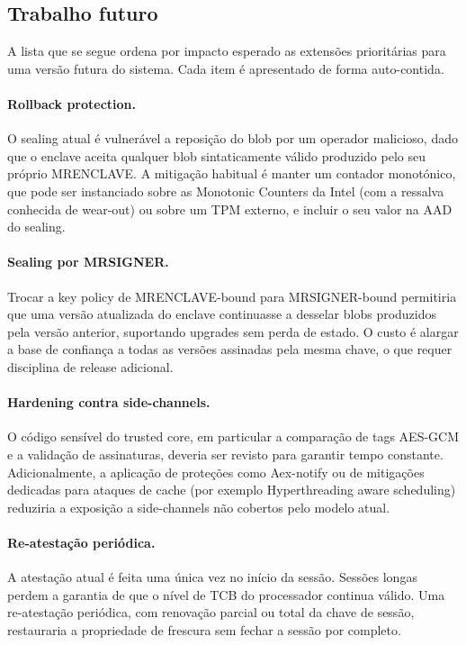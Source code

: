 \subsection{Trabalho futuro}

A lista que se segue ordena por impacto esperado as extensões prioritárias para uma versão futura do sistema. Cada item é apresentado de forma auto-contida.

\paragraph{Rollback protection.} O sealing atual é vulnerável a reposição do blob por um operador malicioso, dado que o enclave aceita qualquer blob sintaticamente válido produzido pelo seu próprio MRENCLAVE. A mitigação habitual é manter um contador monotónico, que pode ser instanciado sobre as Monotonic Counters da Intel (com a ressalva conhecida de wear-out) ou sobre um TPM externo, e incluir o seu valor na AAD do sealing.

\paragraph{Sealing por MRSIGNER.} Trocar a key policy de MRENCLAVE-bound para MRSIGNER-bound permitiria que uma versão atualizada do enclave continuasse a desselar blobs produzidos pela versão anterior, suportando upgrades sem perda de estado. O custo é alargar a base de confiança a todas as versões assinadas pela mesma chave, o que requer disciplina de release adicional.

\paragraph{Hardening contra side-channels.} O código sensível do trusted core, em particular a comparação de tags AES-GCM e a validação de assinaturas, deveria ser revisto para garantir tempo constante. Adicionalmente, a aplicação de proteções como Aex-notify ou de mitigações dedicadas para ataques de cache (por exemplo Hyperthreading aware scheduling) reduziria a exposição a side-channels não cobertos pelo modelo atual.

\paragraph{Re-atestação periódica.} A atestação atual é feita uma única vez no início da sessão. Sessões longas perdem a garantia de que o nível de TCB do processador continua válido. Uma re-atestação periódica, com renovação parcial ou total da chave de sessão, restauraria a propriedade de frescura sem fechar a sessão por completo.


